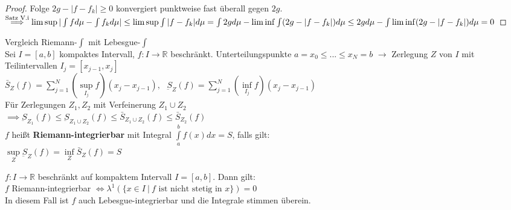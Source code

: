   \begin{proof}
    Folge $2g-|f-f_k| \geq 0$ konvergiert punktweise fast überall gegen $2g$. \\
    $\overset{\text{Satz V.i}}{\implies} \limsup |\int f d\mu - \int f_k d\mu | \leq \limsup \int |f-f_k| d\mu \\ = \int 2g d\mu - \liminf \int (2g-|f-f_k|)d\mu \\ \leq 2g d\mu - \int \liminf (2g-|f-f_k|)d\mu = 0$
  \end{proof}

  \begin{remark}[Anwendung]
    Vergleich Riemann-$\int$ mit Lebesgue-$\int$\\
    Sei $I=[a,b]$ kompaktes Intervall, $f:I \to \mathbb{R}$ beschränkt. Unterteilungspunkte $a = x_0 \leq ... \leq x_N = b$ $\to$ Zerlegung $Z$ von $I$ mit Teilintervallen $I_j = [x_{j-1}, x_j]$\\
    $\bar{S}_Z(f) = \sum\limits_{j=1}^N (\sup\limits_{I_j} f) (x_j - x_{j-1}), \ \ \ \underbar{S}_Z(f)= \sum\limits_{j=1}^N (\inf\limits_{I_j} f)(x_j-x_{j-1})$\\
    Für Zerlegungen $Z_1, Z_2$ mit Verfeinerung $Z_1 \cup Z_2$\\
    $\implies \underbar{S}_{Z_1}(f) \leq \underbar{S}_{Z_1 \cup Z_2}(f) \leq \bar{S}_{Z_1 \cup Z_2}(f) \leq \bar{S}_{Z_2}(f)$\\
    $f$ heißt \textbf{Riemann-integrierbar} mit Integral $\int\limits_a^b f(x) dx = S$, falls gilt:\\
    $\sup\limits_Z \underbar{S}_Z(f) = \inf\limits_Z \bar{S}_Z(f) = S$
  \end{remark}

  \begin{theorem}
    $f: I \to \mathbb{R}$ beschränkt auf kompaktem Intervall $I=[a,b]$. Dann gilt:\\
    $f$ Riemann-integrierbar $\Leftrightarrow \lambda^1(\{x \in I \ | \ f \text{ ist nicht stetig in } x\}) = 0$\\
    In diesem Fall ist $f$ auch Lebesgue-integrierbar und die Integrale stimmen überein.
  \end{theorem}

